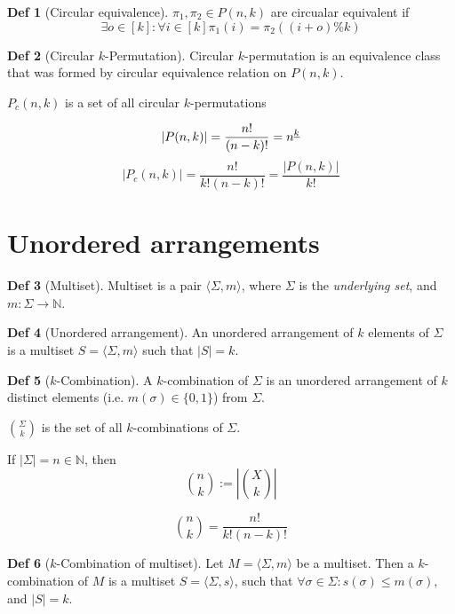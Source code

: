 \documentclass[a4paper]{article}
\theoremstyle{definition}
\newtheorem{definition}{Def}
\begin{document}
\begin{definition}[Circular equivalence]
  \(\pi_1, \pi_2 \in P(n, k)\) are circualar equivalent if
  \[\exists o \in [k] : \forall i \in [k] \pi_1(i) = \pi_2((i + o) \% k) \]
\end{definition}

\begin{definition}[Circular \(k\)-Permutation]
  Circular \(k\)-permutation is an equivalence class that was formed
  by circular equivalence relation on \(P(n, k)\).
\end{definition}

\(P_c(n, k)\) is a set of all circular \(k\)-permutations

\[|P(n, k)| = \frac{n!}{(n - k)!} = {n}^{\underline{k}}\]
\[|P_c(n, k)| = \frac{n!}{k! (n - k)!} = \frac{|P(n, k)|}{k!}\]

\section{Unordered arrangements}

\begin{definition}[Multiset]
  Multiset is a pair \( \langle \Sigma, m \rangle \),
  where \(\Sigma\) is the \textit{underlying set},
  and \(m : \Sigma \to \mathbb{N}\).
\end{definition}

\begin{definition}[Unordered arrangement]
  An unordered arrangement of \(k\) elements of \(\Sigma\)
  is a multiset \(S = \langle \Sigma, m \rangle\) such that \(|S| = k\).
\end{definition}

\begin{definition}[\(k\)-Combination]
  A \(k\)-combination of \(\Sigma\) is an unordered arrangement of \(k\)
  distinct elements (i.e. \(m(\sigma) \in \{0, 1\}\)) from \(\Sigma\).
\end{definition}

\(\binom{\Sigma}{k}\) is the set of all \(k\)-combinations of \(\Sigma\).

If \(|\Sigma| = n \in \mathbb{N}\), then
\[\binom{n}{k} := \left|\binom{X}{k}\right|\]

\[\binom{n}{k} = \frac{n!}{k!(n-k)!}\]

\begin{definition}[\(k\)-Combination of multiset]
  Let \(M = \langle \Sigma, m \rangle\) be a multiset.
  Then a \(k\)-combination of \(M\) is a multiset
  \(S = \langle \Sigma, s \rangle\), such that
  \(\forall \sigma \in \Sigma : s(\sigma) \le m(\sigma)\),
  and \(|S| = k\).
\end{definition}
\end{document}
